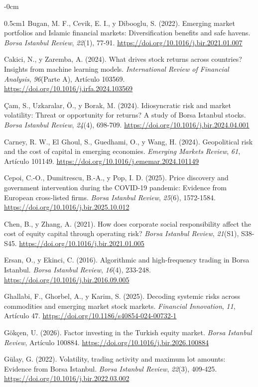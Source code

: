 \documentclass[jrfm,article,submit,oneauthor]{Definitions/mdpi}
\begin{document}
\begin{adjustwidth}{-\extralength}{0cm}
{\begin{hangparas}{0.5cm}{1}
Bugan, M. F., Cevik, E. I., y Dibooglu, S. (2022). Emerging market portfolios and Islamic financial markets: Diversification benefits and safe havens. \textit{Borsa Istanbul Review}, \textit{22}(1), 77-91. \url{https://doi.org/10.1016/j.bir.2021.01.007}

Cakici, N., y Zaremba, A. (2024). What drives stock returns across countries? Insights from machine learning models. \textit{International Review of Financial Analysis}, \textit{96}(Parte A), Artículo 103569. \url{https://doi.org/10.1016/j.irfa.2024.103569}

Çam, S., Uzkaralar, Ö., y Borak, M. (2024). Idiosyncratic risk and market volatility: Threat or opportunity for returns? A study of Borsa Istanbul stocks. \textit{Borsa Istanbul Review}, \textit{24}(4), 698-709. \url{https://doi.org/10.1016/j.bir.2024.04.001}

Carney, R. W., El Ghoul, S., Guedhami, O., y Wang, H. (2024). Geopolitical risk and the cost of capital in emerging economies. \textit{Emerging Markets Review}, \textit{61}, Artículo 101149. \url{https://doi.org/10.1016/j.ememar.2024.101149}

Cepoi, C.-O., Dumitrescu, B.-A., y Pop, I. D. (2025). Price discovery and government intervention during the COVID-19 pandemic: Evidence from European cross-listed firms. \textit{Borsa Istanbul Review}, \textit{25}(6), 1572-1584. \url{https://doi.org/10.1016/j.bir.2025.10.012}

Chen, B., y Zhang, A. (2021). How does corporate social responsibility affect the cost of equity capital through operating risk? \textit{Borsa Istanbul Review}, \textit{21}(S1), S38-S45. \url{https://doi.org/10.1016/j.bir.2021.01.005}

Ersan, O., y Ekinci, C. (2016). Algorithmic and high-frequency trading in Borsa Istanbul. \textit{Borsa Istanbul Review}, \textit{16}(4), 233-248. \url{https://doi.org/10.1016/j.bir.2016.09.005}

Ghallabi, F., Ghorbel, A., y Karim, S. (2025). Decoding systemic risks across commodities and emerging market stock markets. \textit{Financial Innovation}, \textit{11}, Artículo 47. \url{https://doi.org/10.1186/s40854-024-00732-1}

Gökçen, U. (2026). Factor investing in the Turkish equity market. \textit{Borsa Istanbul Review}, Artículo 100884. \url{https://doi.org/10.1016/j.bir.2026.100884}

Gülay, G. (2022). Volatility, trading activity and maximum lot amounts: Evidence from Borsa Istanbul. \textit{Borsa Istanbul Review}, \textit{22}(3), 409-425. \url{https://doi.org/10.1016/j.bir.2022.03.002}


\end{hangparas}}
\end{adjustwidth}
\end{document}
